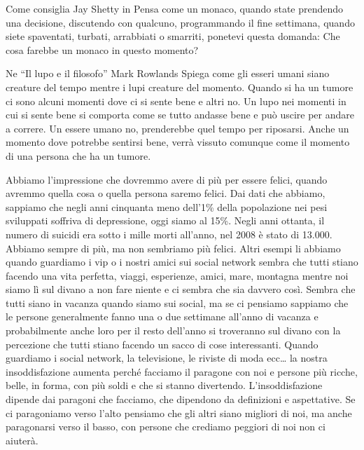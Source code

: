 \documentclass[12pt]{book} %
\begin{document}
\begin{mdframed}[linewidth=1pt]
Come consiglia Jay Shetty in Pensa come un monaco, quando state prendendo una
decisione, discutendo con qualcuno, programmando il fine settimana, quando siete spaventati, turbati, arrabbiati o
smarriti, ponetevi questa domanda: Che cosa farebbe un monaco in questo momento? 

Ne “Il lupo e il filosofo” Mark
Rowlands Spiega come gli esseri umani siano creature del tempo mentre i lupi creature del momento. Quando si ha un
tumore ci sono alcuni momenti dove ci si sente bene e altri no. Un lupo nei momenti in cui si sente bene si comporta
come se tutto andasse bene e può uscire per andare a correre. Un essere umano no, prenderebbe quel tempo per riposarsi.
Anche un momento dove potrebbe sentirsi bene, verrà vissuto comunque come il momento di una persona che ha un tumore.
\end{mdframed}

Abbiamo l'impressione che dovremmo avere di più per essere felici, quando avremmo quella cosa o
quella persona saremo felici. Dai dati che abbiamo, sappiamo che negli anni cinquanta meno
dell'1\% della popolazione nei pesi sviluppati soffriva di depressione, oggi siamo al 15\%. Negli
anni ottanta, il numero di suicidi era sotto i mille morti all'anno, nel 2008 è stato di 13.000.
Abbiamo sempre di più, ma non sembriamo più felici. Altri esempi li abbiamo quando guardiamo i vip o i nostri amici sui
social network sembra che tutti stiano facendo una vita perfetta, viaggi, esperienze, amici, mare, montagna mentre noi
siamo lì sul divano a non fare niente e ci sembra che sia davvero così. Sembra che tutti siano in vacanza quando siamo sui social, ma se
ci pensiamo sappiamo che le persone generalmente fanno una o due settimane all'anno di vacanza e
probabilmente anche loro per il resto dell'anno si troveranno sul divano con la percezione che
tutti stiano facendo un sacco di cose interessanti. Quando guardiamo i social network, la
televisione, le riviste di moda ecc… la nostra insoddisfazione aumenta perché facciamo il paragone con noi e persone
più ricche, belle, in forma, con più soldi e che si stanno divertendo. L'insoddisfazione dipende dai paragoni che
facciamo, che dipendono da definizioni e aspettative. Se ci paragoniamo verso l'alto pensiamo che gli altri siano
migliori di noi, ma anche paragonarsi verso il basso, con persone che crediamo peggiori di noi non ci aiuterà.
\end{document}
